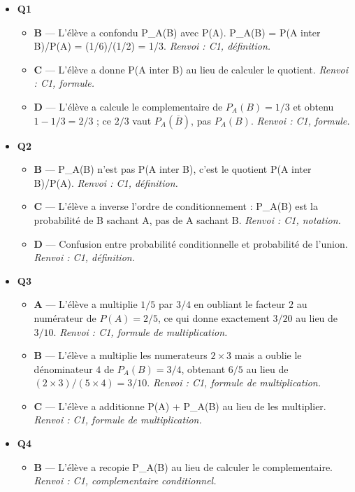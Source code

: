 \begin{itemize}
  \item \textbf{Q1}
  \begin{itemize}
    \item \textbf{B} — L'élève a confondu P\_A(B) avec P(A). P\_A(B) = P(A inter B)/P(A) = (1/6)/(1/2) = 1/3. \emph{Renvoi : C1, définition.}
    \item \textbf{C} — L'élève a donne P(A inter B) au lieu de calculer le quotient. \emph{Renvoi : C1, formule.}
    \item \textbf{D} — L'élève a calcule le complementaire de $P_A(B)=1/3$ et obtenu $1-1/3=2/3$ ; ce $2/3$ vaut $P_A(\overline B)$, pas $P_A(B)$. \emph{Renvoi : C1, formule.}
  \end{itemize}
  \item \textbf{Q2}
  \begin{itemize}
    \item \textbf{B} — P\_A(B) n'est pas P(A inter B), c'est le quotient P(A inter B)/P(A). \emph{Renvoi : C1, définition.}
    \item \textbf{C} — L'élève a inverse l'ordre de conditionnement : P\_A(B) est la probabilité de B sachant A, pas de A sachant B. \emph{Renvoi : C1, notation.}
    \item \textbf{D} — Confusion entre probabilité conditionnelle et probabilité de l'union. \emph{Renvoi : C1, définition.}
  \end{itemize}
  \item \textbf{Q3}
  \begin{itemize}
    \item \textbf{A} — L'élève a multiplie $1/5$ par $3/4$ en oubliant le facteur $2$ au numérateur de $P(A)=2/5$, ce qui donne exactement $3/20$ au lieu de $3/10$. \emph{Renvoi : C1, formule de multiplication.}
    \item \textbf{B} — L'élève a multiplie les numerateurs $2 \times 3$ mais a oublie le dénominateur $4$ de $P_A(B)=3/4$, obtenant $6/5$ au lieu de $(2 \times 3)/(5 \times 4)=3/10$. \emph{Renvoi : C1, formule de multiplication.}
    \item \textbf{C} — L'élève a additionne P(A) + P\_A(B) au lieu de les multiplier. \emph{Renvoi : C1, formule de multiplication.}
  \end{itemize}
  \item \textbf{Q4}
  \begin{itemize}
    \item \textbf{B} — L'élève a recopie P\_A(B) au lieu de calculer le complementaire. \emph{Renvoi : C1, complementaire conditionnel.}

\end{itemize}
\end{itemize}
